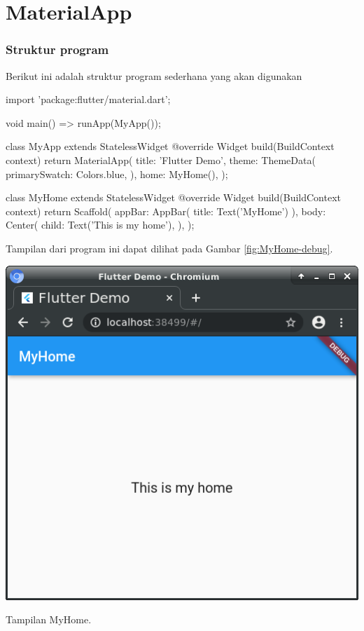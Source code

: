 \part{MaterialApp}

\section{Struktur program}

Berikut ini adalah struktur program sederhana yang akan digunakan
\begin{dartcode}
import 'package:flutter/material.dart';
  
void main() => runApp(MyApp());
  
class MyApp extends StatelessWidget {
  @override
  Widget build(BuildContext context) {
    return MaterialApp(
      title: 'Flutter Demo',
      theme: ThemeData(
        primarySwatch: Colors.blue,
      ),
      home: MyHome(),
    );
  }
}
  
class MyHome extends StatelessWidget {
  @override
  Widget build(BuildContext context) {
    return Scaffold(
      appBar: AppBar(
        title: Text('MyHome')
      ),
      body: Center(
        child: Text('This is my home'),
      ),
    );
  }
}
\end{dartcode}

Tampilan dari program ini dapat dilihat pada Gambar \ref{fig:MyHome-debug}.
\begin{marginfigure}
{\centering
\includegraphics[width=\marginparwidth]{images/MyHome_debug.png}
\par}
\caption{Tampilan MyHome.}
\label{fig:MyHome-debug}
\end{marginfigure}

